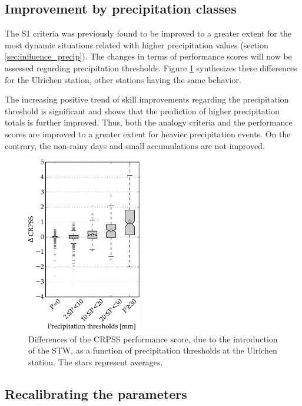 \documentclass[hess]{copernicus}
\begin{document}
\subsection{Improvement by precipitation classes}
\label{sec:improvement_CRPSS_precip_threshold}

The S1 criteria was previously found to be improved to a greater extent for the most dynamic situations related with higher precipitation values (section \ref{sec:influence_precip}). The changes in terms of performance scores will now be assessed regarding precipitation thresholds. Figure \ref{fig:changes_CRPS_precip_threshold} synthesizes these differences for the Ulrichen station, other stations having the same behavior.

The increasing positive trend of skill improvements regarding the precipitation threshold is significant and shows that the prediction of higher precipitation totals is further improved. Thus, both the analogy criteria and the performance scores are improved to a greater extent for heavier precipitation events. On the contrary, the non-rainy days and small accumulations are not improved.

\begin{figure}[htb]
	\includegraphics[width=5cm]{figures/changes_CRPS_precip_threshold.pdf}
	\caption{Differences of the CRPSS performance score, due to the introduction of the STW, as a function of precipitation thresholds at the Ulrichen station. The stars represent averages.}
	\label{fig:changes_CRPS_precip_threshold}
\end{figure}


\subsection{Recalibrating the parameters}
\label{sec:recalibration}
\end{document}
